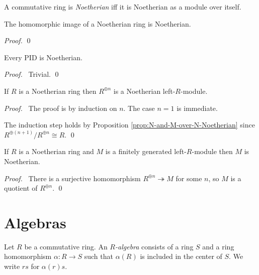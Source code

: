 \begin{df}
A commutative ring is \emph{Noetherian} iff it is Noetherian as a module over itself.
\end{df}

\begin{prop}
The homomorphic image of a Noetherian ring is Noetherian.
\end{prop}

\begin{proof}
\pf
{}
\qed
\end{proof}

\begin{prop}
Every PID is Noetherian.
\end{prop}

\begin{proof}
\pf\ Trivial. \qed
\end{proof}

\begin{prop}
If $R$ is a Noetherian ring then $R^{\oplus n}$ is a Noetherian left-$R$-module.
\end{prop}

\begin{proof}
\pf\ The proof is by induction on $n$. The case $n = 1$ is immediate.

The induction step holds by Proposition \ref{prop:N-and-M-over-N-Noetherian} since $R^{\oplus (n+1)} / R^{\oplus n} \cong R$. \qed
\end{proof}

\begin{cor}
If $R$ is a Noetherian ring and $M$ is a finitely generated left-$R$-module then $M$ is Noetherian.
\end{cor}

\begin{proof}
\pf\ There is a surjective homomorphism $R^{\oplus n} \twoheadrightarrow M$ for some $n$, so $M$ is a quotient of $R^{\oplus n}$. \qed
\end{proof}

\chapter{Algebras}

\begin{df}[Algebra]
Let $R$ be a commutative ring. An \emph{$R$-algebra} consists of a ring $S$ and a ring homomorphism $\alpha : R \rightarrow S$ such that $\alpha(R)$ is included in the center of $S$. We write $rs$ for $\alpha(r)s$.
\end{df}

